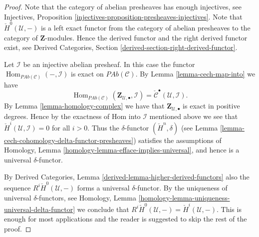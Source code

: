 \documentclass[10pt,a4paper]{amsart}
\theoremstyle{plain}
\theoremstyle{definition}
\theoremstyle{remark}
\numberwithin{equation}{subsection}
\def\Hom{\mathop{\mathrm{Hom}}\nolimits}
\begin{document}
\begin{proof}
Note that the category of abelian presheaves has enough injectives, see
Injectives, Proposition \ref{injectives-proposition-presheaves-injectives}.
Note that $\check{H}^0(\mathcal{U}, -)$ is a left exact functor
from the category of abelian presheaves
to the category of $\mathbf{Z}$-modules.
Hence the derived functor and the right derived functor exist, see
Derived Categories, Section \ref{derived-section-right-derived-functor}.

\medskip\noindent
Let $\mathcal{I}$ be an injective abelian presheaf.
In this case the functor
$\Hom_{\textit{PAb}(\mathcal{C})}(-, \mathcal{I})$
is exact on $\textit{PAb}(\mathcal{C})$. By
Lemma \ref{lemma-cech-map-into} we have
$$
\Hom_{\textit{PAb}(\mathcal{C})}(
\mathbf{Z}_{\mathcal{U}, \bullet}, \mathcal{I})
=
\check{\mathcal{C}}^\bullet(\mathcal{U}, \mathcal{I}).
$$
By Lemma \ref{lemma-homology-complex} we have that
$\mathbf{Z}_{\mathcal{U}, \bullet}$ is exact in positive degrees.
Hence by the exactness of Hom into $\mathcal{I}$ mentioned above we see
that $\check{H}^i(\mathcal{U}, \mathcal{I}) = 0$ for all
$i > 0$. Thus the $\delta$-functor $(\check{H}^n, \delta)$
(see Lemma \ref{lemma-cech-cohomology-delta-functor-presheaves})
satisfies the assumptions of
Homology, Lemma \ref{homology-lemma-efface-implies-universal},
and hence is a universal $\delta$-functor.

\medskip\noindent
By
Derived Categories, Lemma \ref{derived-lemma-higher-derived-functors}
also the sequence $R^i\check{H}^0(\mathcal{U}, -)$
forms a universal $\delta$-functor. By the uniqueness of universal
$\delta$-functors, see
Homology, Lemma \ref{homology-lemma-uniqueness-universal-delta-functor}
we conclude that
$R^i\check{H}^0(\mathcal{U}, -) = \check{H}^i(\mathcal{U}, -)$.
This is enough for most applications
and the reader is suggested to skip the rest of the proof.


\end{proof}
\end{document}
